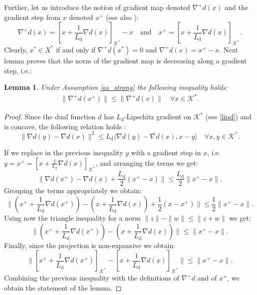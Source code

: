 \documentclass{gOMS2e}
\theoremstyle{plain}
\newtheorem{lemma}[theorem]{Lemma}
\theoremstyle{definition}
\theoremstyle{remark}
\begin{document}
\noindent Further, let us  introduce the notion of gradient map
denoted  $\nabla^+ d(x)$ and the gradient step from $x$ denoted
$x^+$ (see also \cite{Nes:04}):
\begin{equation}
\label{eq_gradient_map} \nabla^+ d(x)=\left[x + \frac{1}{L_\text{d}}
\nabla d(x)\right]_{{\mathcal{K}}^*} - x   \quad \text{and} \quad x^+ =
\left[x + \frac{1}{L_\text{d}} \nabla d(x)\right]_{{\mathcal{K}}^*}.
\end{equation}
Clearly, $x^* \in X^*$ if and only if $\nabla^+ d(x^*) =0$ and
$\nabla^+ d(x) =  x^+ - x$. Next lemma proves that the norm of the
gradient map is  decreasing along a gradient step, i.e.:

\begin{lemma}
\label{lemma2_dg} Under Assumption \ref{as_strong} the following
inequality holds:
\begin{align}
\label{decrease_gm} \|\nabla^+ d(x^+)\| \leq \|\nabla^+ d(x)\| \quad
\forall x \in {\mathcal{K}}^*.
\end{align}
\end{lemma}

\begin{proof}
Since the dual function $d$ has $L_\text{d}$-Lipschitz gradient on
${\mathcal{K}}^*$ (see \eqref{lipd}) and is concave, the following relation
holds \cite{Nes:04}:
\[  \| \nabla d(y) - \nabla d(x) \|^2 \leq L_\text{d}
\langle \nabla d(y) - \nabla d(x), x-y \rangle \quad \forall x,y \in
{\mathcal{K}}^*. \]

\noindent If we replace in the previous inequality $y$ with a
gradient step in $x$, i.e. $y = x^+ = [x + \frac{1}{L_\text{d}}
\nabla d(x)]_{{\mathcal{K}}^*}$, and arranging the terms we get:
\[ \| \nabla d(x^+) - \nabla d(x) + \frac{L_\text{d}}{2} (x^+ - x) \|
\leq \frac{L_\text{d}}{2} \|x^+ - x\|.   \] Grouping the terms
appropriately we obtain:
\[ \| (x^+ + \frac{1}{L_\text{d}}\nabla d(x^+)) - (x + \frac{1}{L_\text{d}} \nabla d(x)) + \frac{1}{2} (x - x^+) \|
\leq \frac{1}{2} \|x^+ - x\|. \] Using now the  triangle inequality
for a norm $\|z\| - \|w\| \leq \| z+ w\|$ we get:
\[ \| (x^+ + \frac{1}{L_\text{d}}\nabla d(x^+)) -
(x + \frac{1}{L_\text{d}} \nabla d(x)) \| \leq  \|x^+ - x\|.
\]
Finally, since the projection is  non-expansive  we obtain:
\[ \| [x^+ + \frac{1}{L_\text{d}}\nabla d(x^+)]_{{\mathcal{K}}^*} -
[x + \frac{1}{L_\text{d}} \nabla d(x)]_{{\mathcal{K}}^*} \| \leq  \|x^+ - x\|.
\]
Combining the previous inequality with  the definitions of $\nabla ^+
d$ and of $x^+$, we obtain the statement of the lemma.
\end{proof}
\end{document}
